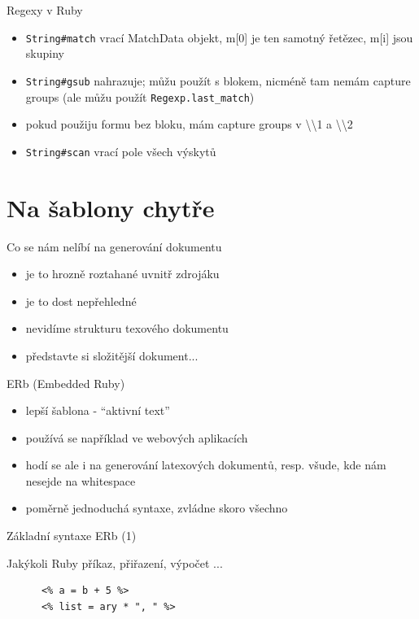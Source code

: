\documentclass{beamer}
\begin{document}
\begin{frame}{Regexy v Ruby}
  \begin{itemize}
    \item \texttt{String\#match} vrací MatchData objekt, m[0] je ten samotný řetězec, m[i] jsou skupiny
    \item \texttt{String\#gsub} nahrazuje; můžu použít s blokem, nicméně tam nemám capture groups (ale můžu použít \texttt{Regexp.last\_match})
    \item pokud použiju formu bez bloku, mám capture groups v \textbackslash \textbackslash 1 a \textbackslash \textbackslash 2
    \item \texttt{String\#scan} vrací pole všech výskytů
  \end{itemize}
\end{frame}

\section{Na šablony chytře}

\begin{frame}{Co se nám nelíbí na generování dokumentu}
  \begin{itemize}
    \item je to hrozně roztahané uvnitř zdrojáku
    \item je to dost nepřehledné
    \item nevidíme strukturu texového dokumentu
    \item představte si složitější dokument...
  \end{itemize}
\end{frame}

\begin{frame}{ERb (Embedded Ruby)}
  \begin{itemize}
    \item lepší šablona - ``aktivní text''
    \item používá se například ve webových aplikacích
    \item hodí se ale i na generování latexových dokumentů, resp. všude, kde nám nesejde na whitespace
    \item poměrně jednoduchá syntaxe, zvládne skoro všechno
  \end{itemize}
\end{frame}

\begin{frame}[fragile]{Základní syntaxe ERb (1)}
  \begin{block}{ }
    Jakýkoli Ruby příkaz, přiřazení, výpočet ...
    \scriptsize
    \begin{verbatim}
      <% a = b + 5 %>
      <% list = ary * ", " %>
    \end{verbatim}
  \end{block}
\end{frame}
\end{document}
